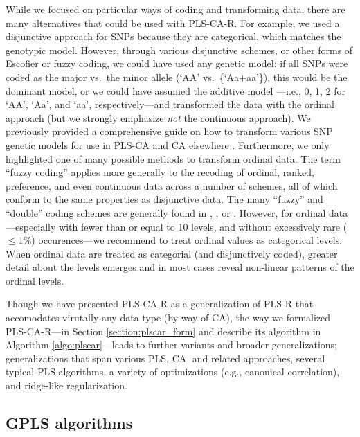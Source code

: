 \documentclass[12pt]{article}
\begin{document}
While we focused on particular ways of coding and transforming data,
there are many alternatives that could be used with PLS-CA-R. For
example, we used a disjunctive approach for SNPs because they are
categorical, which matches the genotypic model. However, through various
disjunctive schemes, or other forms of Escofier or fuzzy coding, we
could have used any genetic model: if all SNPs were coded as the major
vs.~the minor allele (`AA' vs.~\{`Aa+aa'\}), this would be the dominant
model, or we could have assumed the additive model ---i.e., 0, 1, 2 for
`AA', `Aa', and `aa', respectively---and transformed the data with the
ordinal approach (but we strongly emphasize \emph{not} the continuous
approach). We previously provided a comprehensive guide on how to
transform various SNP genetic models for use in PLS-CA and CA elsewhere
\citep[see Appendix of][]{beaton_partial_2016}. Furthermore, we only
highlighted one of many possible methods to transform ordinal data. The
term ``fuzzy coding'' applies more generally to the recoding of ordinal,
ranked, preference, and even continuous data across a number of schemes,
all of which conform to the same properties as disjunctive data. The
many ``fuzzy'' and ``double'' coding schemes are generally found in
\citet{escofier_traitement_1979}, \citet{lebart_multivariate_1984}, or
\citet{greenacrefuzzy}. However, for ordinal data---especially with
fewer than or equal to 10 levels, and without excessively rare
(\(\leq 1\)\%) occurences---we recommend to treat ordinal values as
categorical levels. When ordinal data are treated as categorial (and
disjunctively coded), greater detail about the levels emerges and in
most cases reveal non-linear patterns of the ordinal levels.

Though we have presented PLS-CA-R as a generalization of PLS-R that
accomodates virutally any data type (by way of CA), the way we
formalized PLS-CA-R---in Section \ref{section:plscar_form} and describe
its algorithm in Algorithm \ref{algo:plscar}---leads to further variants
and broader generalizations; generalizations that span various PLS, CA,
and related approaches, several typical PLS algorithms, a variety of
optimizations (e.g., canonical correlation), and ridge-like
regularization.

\hypertarget{gpls-algorithms}{%
\subsection{GPLS algorithms}\label{gpls-algorithms}}
\end{document}
